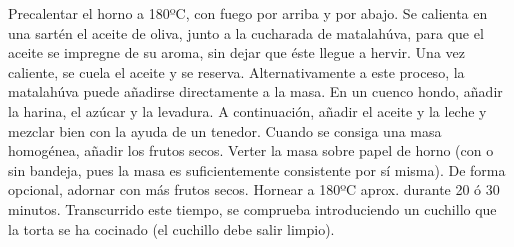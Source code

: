 Precalentar el horno a 180ºC, con fuego por arriba y por abajo.
Se calienta en una sartén el aceite de oliva, junto a la cucharada de matalahúva, para que el aceite se impregne de su aroma, sin dejar que éste llegue a hervir. Una vez caliente, se cuela el aceite y se reserva.
Alternativamente a este proceso, la matalahúva puede añadirse directamente a la masa.
En un cuenco hondo, añadir la harina, el azúcar y la levadura. A continuación, añadir el aceite y la leche y mezclar bien con la ayuda de un tenedor. Cuando se consiga una masa homogénea, añadir los frutos secos.
Verter la masa sobre papel de horno (con o sin bandeja, pues la masa es suficientemente consistente por sí misma). De forma opcional, adornar con más frutos secos.
Hornear a 180ºC aprox. durante 20 ó 30 minutos. Transcurrido este tiempo, se comprueba introduciendo un cuchillo que la torta se ha cocinado (el cuchillo debe salir limpio).
